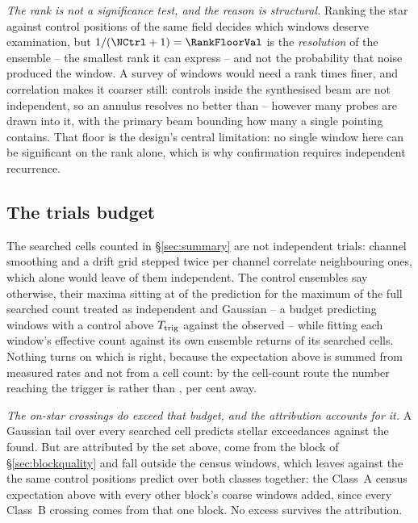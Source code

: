 \emph{The rank is not a significance test, and the reason is structural.}
Ranking the star against \NCtrl{} control positions of the same field
decides which windows deserve examination, but $1/(\NCtrl+1)=\RankFloorVal$
is the \emph{resolution} of the ensemble -- the smallest rank it can
express -- and not the probability that noise produced the window. A survey
of \NWindows{} windows would need a rank \BonfRankRatio{} times finer, and
correlation makes it coarser still: controls inside the synthesised beam are
not independent, so an annulus resolves no better than
\RankEffLo--\RankEffHi{} however many probes are drawn into it, with the
primary beam bounding how many a single pointing contains. That floor is the
design's central limitation: no single window here can be significant on the
rank alone, which is why confirmation requires independent recurrence.

\subsection{The trials budget}

The searched cells counted in \S\ref{sec:summary} are not independent
trials: channel smoothing and a drift grid stepped twice per channel
correlate neighbouring ones, which alone would leave \StGridFrac{} of them
independent. The control ensembles say otherwise, their maxima sitting at
\CtrlMaxRatioMed{} of the prediction for the maximum of the full searched
count treated as independent and Gaussian -- a budget predicting
\NCtrlWinExp{} windows with a control above $T_{\rm trig}$ against the
\NCtrlWinObs{} observed -- while fitting each window's effective count
against its own ensemble returns \StNindFrac{} of its searched cells. Nothing
turns on which is right, because the expectation above is summed from measured
rates and not from a cell count: by the cell-count route the number reaching
the trigger is \StExpModel{} rather than \CeExpTrig, \StModelAgreePct{} per
cent away.

\emph{The on-star crossings do exceed that budget, and the attribution
accounts for it.} A Gaussian tail over every searched cell predicts
\CellExpect{} stellar exceedances against the \NCross{} found. But \MkAttr{}
are attributed by the set above, \EvNCrossFlag{} come from the block of
\S\ref{sec:blockquality} and \CeNTailCross{} fall outside the census windows,
which leaves \CeObs{} against the \CeExpSurv{} the same control positions
predict over both classes together: the Class~A census expectation above with
every other block's coarse windows added, since every Class~B crossing comes
from that one block. No excess survives
the
attribution.

